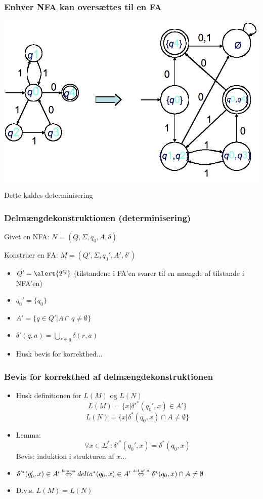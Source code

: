 \begin{frame}
\frametitle{Enhver NFA kan oversættes til en FA}
\begin{center}
  \includegraphics[scale=0.4]{images/2_seminar_convert}
\end{center}
\pause

Dette kaldes determinisering
\end{frame}

\begin{frame}
\frametitle{Delmængdekonstruktionen (determinisering)}
Givet en NFA: $N=(Q, \Sigma, q_0, A, \delta)$

Konstruer en FA: $M=(Q', \Sigma, q_0', A', \delta')$
\pause
\begin{itemize}[<+->]
\item $Q'=\alert{2^{Q}}$ (tilstandene i FA'en svarer til en mængde af tilstande i NFA'en)
\item $q_0' = \{q_0\}$
\item $A' = \{q \in Q' | A \cap q \neq \emptyset \}$
\item $\delta'(q, a) = \bigcup_{r\in q}\delta(r,a)$
\item Husk bevis for korrekthed...
\end{itemize}
\end{frame}
\begin{frame}
  \frametitle{Bevis for korrekthed af delmængdekonstruktionen}
\begin{itemize}[<+->]
\item Husk definitionen for $L(M)$ og $L(N)$
\[L(M) = \{x | \delta'^*(q_0', x) \in A'\}\]
\[L(N) = \{x | \delta^*(q_0, x) \cap A \neq \emptyset\}\]
\item Lemma:
\[\forall x\in \Sigma^*: \delta'^*(q_0', x) = \delta^*(q_0, x)\]
Bevis: induktion i strukturen af $x$...
\item $ \delta'^*(q_0', x) \in A' \overset{\text{\tiny{lemma}}}{\Leftrightarrow} 
delta^*(q_0, x) \in A' \overset{\text{\tiny{def af A}}}{\Leftrightarrow} \delta^*(q_0, x) \cap A \neq \emptyset$
\item D.v.s. $L(M)=L(N)$
\end{itemize}
\end{frame}

